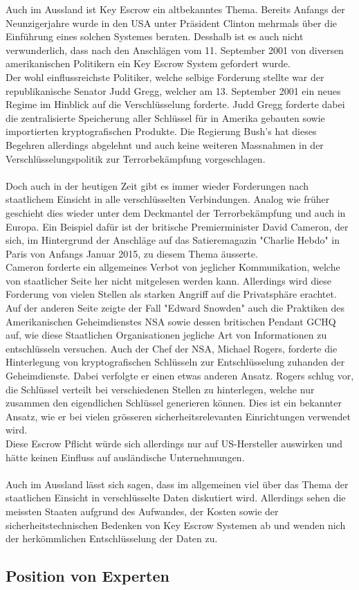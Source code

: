 Auch im Aussland ist Key Escrow ein altbekanntes Thema. Bereits Anfangs der Neunzigerjahre wurde in den USA unter Präsident Clinton mehrmals über die Einführung eines solchen Systemes beraten. \cite{adminch} \cite{denning} %
Desshalb ist es auch nicht verwunderlich, dass nach den Anschlägen vom 11. September 2001 von diversen amerikanischen Politikern ein Key Escrow System gefordert wurde. \\
Der wohl einflussreichste Politiker, welche selbige Forderung stellte war der republikanische Senator Judd Gregg, welcher am 13. September 2001 ein neues Regime im Hinblick auf die Verschlüsselung forderte. Judd Gregg forderte dabei die zentralisierte Speicherung aller Schlüssel für in Amerika gebauten sowie importierten kryptografischen Produkte. Die Regierung Bush's hat dieses Begehren allerdings abgelehnt und auch keine weiteren Massnahmen in der Verschlüsselungspolitik zur Terrorbekämpfung vorgeschlagen. \cite{denning}\\ %
\\
Doch auch in der heutigen Zeit gibt es immer wieder Forderungen nach staatlichem Einsicht in alle verschlüsselten Verbindungen. Analog wie früher geschieht dies wieder unter dem Deckmantel der Terrorbekämpfung und auch in Europa. Ein Beispiel dafür ist der britische Premierminister David Cameron, der sich, im Hintergrund der Anschläge auf das Satieremagazin "Charlie Hebdo" in Paris von Anfangs Januar 2015, zu diesem Thema äusserte. \\
Cameron forderte ein allgemeines Verbot von jeglicher Kommunikation, welche von staatlicher Seite her nicht mitgelesen werden kann. Allerdings wird diese Forderung von vielen Stellen als starken Angriff auf die Privatsphäre erachtet. \cite{insideit} \\%
Auf der anderen Seite zeigte der Fall "Edward Snowden" auch die Praktiken des Amerikanischen Geheimdienstes NSA sowie dessen britischen Pendant GCHQ auf, wie diese Staatlichen Organisationen jegliche Art von Informationen zu entschlüsseln versuchen. Auch der Chef der NSA, Michael Rogers, forderte die Hinterlegung von kryptografischen Schlüsseln zur Entschlüsselung zuhanden der Geheimdienste. Dabei verfolgte er einen etwas anderen Ansatz. Rogers schlug vor, die Schlüssel verteilt bei verschiedenen Stellen zu hinterlegen, welche nur zusammen den eigendlichen Schlüssel generieren können. Dies ist ein bekannter Ansatz, wie er bei vielen grösseren sicherheitsrelevanten Einrichtungen verwendet wird. \\
Diese Escrow Pflicht würde sich allerdings nur auf US-Hersteller auswirken und hätte keinen Einfluss auf ausländische Unternehmungen. \cite{annabiselli} \\ %
\\
Auch im Aussland lässt sich sagen, dass im allgemeinen viel über das Thema der staatlichen Einsicht in verschlüsselte Daten diskutiert wird. Allerdings sehen die meissten Staaten aufgrund des Aufwandes, der Kosten sowie der sicherheitstechnischen Bedenken von Key Escrow Systemen ab und wenden nich der herkömmlichen Entschlüsselung der Daten zu.


		
	\subsection{Position von Experten}
